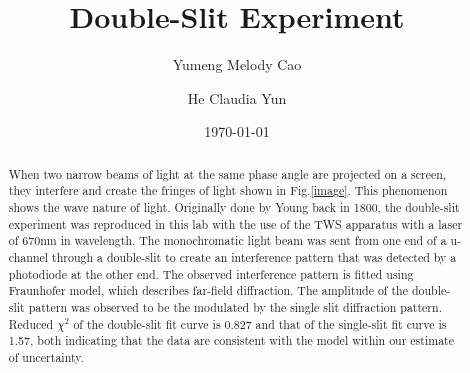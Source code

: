 \documentclass[prb,preprint]{revtex4-1}
\begin{document}
\title{Double-Slit Experiment}

\author{Yumeng Melody Cao}

\author{He Claudia Yun}


\date{\today}


\begin{abstract}

When two narrow beams of light at the same phase angle are projected on a screen, they interfere and create the fringes of light shown in Fig.\ref{image}. This phenomenon shows the wave nature of light. 
Originally done by Young back in 1800, the double-slit experiment was reproduced in this lab with the use of the TWS apparatus with a laser of 670nm in wavelength. The monochromatic light beam was sent from one end of a u-channel through a double-slit to create an interference pattern that was detected by a photodiode at the other end. 
The observed interference pattern is fitted using Fraunhofer model, which describes far-field diffraction. The amplitude of the double-slit pattern was observed to be the modulated by the single slit diffraction pattern. Reduced $\chi^2$ of the double-slit fit curve is 0.827 and that of the single-slit fit curve is 1.57, both indicating that the data are consistent with the model within our estimate of uncertainty.
\end{abstract}
\end{document}
